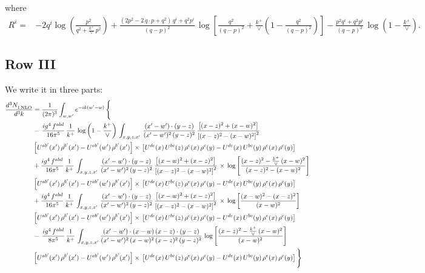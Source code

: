 \documentclass[9pt]{article}
\numberwithin{equation}{section}
\begin{document}
where
\begin{align}
R^{i} =& -2q^{i}\log\left(\frac{p^{2}}{q^{2}+\frac{k^{+}}{\vee}\,p^{2}}\right)
+\frac{(2p^{2}-2\,q\cdot p+q^{2})\,q^{i}+q^{2}p^{i}}{(q-p)^{2}}\,
\log\left[\frac{q^{2}}{(q-p)^{2}}+\frac{k^{+}}{\vee}\left(1-\frac{q^{2}}{(q-p)^{2}}\right)\right]
-\frac{p^{2}q^{i}+q^{2}p^{i}}{(q-p)^{2}}\,\log\left(1-\frac{k^{+}}{\vee}\right).
\end{align}
\subsection{Row III}
We write it in three parts:
\begin{align}
   \frac{d^{3}N_{1\,\rm NLO}^{\rm}}{d^{3}k}  & =  \frac{1}{(2\pi)^{3}}  \int_{w, w^\prime} e^{-ik(w^\prime-w)}\, \Bigg\{\notag \\
& -\,\frac{ig^{4}\,f^{abd}}{16\pi^{5}}\,\frac{1}{k^{+}}\,\log{\left(1-\frac{k^{+}}{\vee}\right)}\,\int_{x,y,z,x'}\, \frac{(x'-w')\cdot (y-z)}{(x'-w')^{2}\,(y-z)^{2}}\,\frac{\left[(x-z)^{2}+(x-w)^{2}\right]}{\left[(x-z)^{2}-(x-w)^{2}\right]^{2}}\notag \\ & \left[U^{ab'}(x')\,\rho^{b'}(x')-U^{ab'}(w')\, \rho^{b'}(x')\right]\times\, \left[U^{de}(x)\,U^{bc}(z)\, \rho^{e}(x)\,\rho^{c}(y)-U^{de}(x)\,U^{bc}(y)\,\rho^{e}(x)\,\rho^{c}(y)\right] \notag \\
&  +\frac{ig^{4}\,f^{abd}}{16\pi^{5}}\, \frac{1}{k^{+}}\,\int_{x,y,z,x'}\, \frac{(x'-w')\cdot (y-z)}{(x'-w')^{2}\,(y-z)^{2}}\, \frac{\left[(x-w)^{2}+(x-z)^{2}\right]}{\left[(x-z)^{2}-(x-w)^{2}\right]^{2}}\, \times\, \log{\left[\frac{(x-z)^{2}-\frac{k^{+}}{\vee}\,(x-w)^{2}}{(x-z)^{2}-(x-w)^{2}}\right]}\notag \\ & \left[U^{ab'}(x')\,\rho^{b'}(x')-U^{ab'}(w')\, \rho^{b'}(x')\right]\times\, \left[U^{de}(x)\,U^{bc}(z)\, \rho^{e}(x)\,\rho^{c}(y)-U^{de}(x)\,U^{bc}(y)\,\rho^{e}(x)\,\rho^{c}(y)\right] \notag \\
&  +\frac{ig^{4}\,f^{abd}}{16\pi^{5}}\, \frac{1}{k^{+}}\,\int_{x,y,z,x'}\, \frac{(x'-w')\cdot (y-z)}{(x'-w')^{2}\,(y-z)^{2}}\, \frac{\left[(x-w)^{2}+(x-z)^{2}\right]}{\left[(x-z)^{2}-(x-w)^{2}\right]^{2}}\, \times\, \log{\left[\frac{(x-w)^{2}-(x-z)^{2}}{(x-w)^{2}}\right]}\notag \\ & \left[U^{ab'}(x')\,\rho^{b'}(x')-U^{ab'}(w')\, \rho^{b'}(x')\right]\times\, \left[U^{de}(x)\,U^{bc}(z)\, \rho^{e}(x)\,\rho^{c}(y)-U^{de}(x)\,U^{bc}(y)\,\rho^{e}(x)\,\rho^{c}(y)\right] \notag \\
&-\, \frac{ig^{4}\,f^{abd}}{8\pi^{5}}\,\frac{1}{k^{+}}\,\int_{x,y,z,x'}\frac{(x'-w')\cdot (x-w)\, (x-z)\cdot (y-z)}{(x'-w')^{2}\, (x-w)^{2}\, (x-z)^{2}\, (y-z)^{2}}\,\log{\left[\frac{(x-z)^{2}-\frac{k^{+}}{\vee}\,(x-w)^{2}}{(x-w)^{2}}\right]} \notag \\ & \left[U^{ab'}(x')\,\rho^{b'}(x')-U^{ab'}(w')\, \rho^{b'}(x')\right]\times\, \left[U^{de}(x)\,U^{bc}(z)\, \rho^{e}(x)\,\rho^{c}(y)-U^{de}(x)\,U^{bc}(y)\,\rho^{e}(x)\,\rho^{c}(y)\right]\Bigg\}
\end{align}
\end{document}
